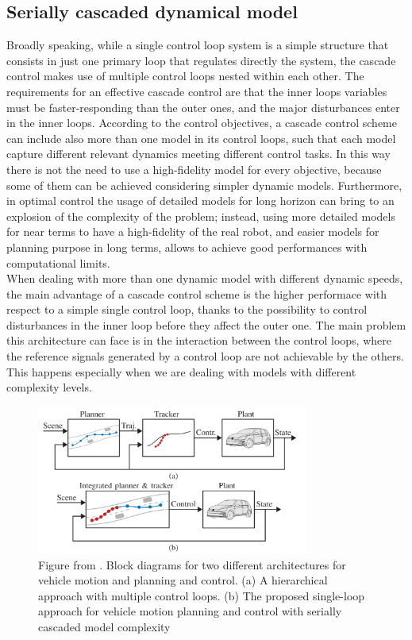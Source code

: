 \documentclass[a4paper, onecolumn, 11pt]{article}
\begin{document}
\subsection{Serially cascaded dynamical model}
Broadly speaking, while a single control loop system is a simple structure that
consists in just one primary loop that regulates directly the system, the
cascade control makes use of multiple control loops nested within each other.
The requirements for an effective cascade control are that the inner loops
variables must be faster-responding than the outer ones, and the major
disturbances enter in the inner loops. 
According to the control objectives, a cascade control scheme can include also 
more than one model in its control loops, such that each model capture different
relevant dynamics meeting different control tasks. In this way there is not the 
need to use a high-fidelity model for every objective, because some of them can 
be achieved considering simpler dynamic models. Furthermore, in optimal control
the usage of detailed models for long horizon can bring to an explosion of the 
complexity of the problem; instead, using more detailed models for near terms 
to have a high-fidelity of the real robot, and easier models for planning purpose
in long terms, allows to achieve good performances with computational limits.\\
When dealing with more than one dynamic model with different dynamic speeds,
the main advantage of a cascade control scheme is the higher performace with respect
to a simple single control loop, thanks to the possibility to control disturbances
in the inner loop before they affect the outer one. The main problem this architecture
can face is in the interaction between the control loops, where the reference signals 
generated by a control loop are not achievable by the others. This happens especially
when we are dealing with models with different complexity levels.

\begin{figure}[H]
    \centering
    \includegraphics[width=0.8\textwidth]{assets/loop.png}
    \caption{Figure from \cite{paper}. Block diagrams for two different
    architectures for vehicle motion and planning and control. (a) A
    hierarchical approach with multiple control loops. (b) The proposed
    single-loop approach for vehicle motion planning and control with serially
    cascaded model complexity}
\end{figure}
\end{document}
